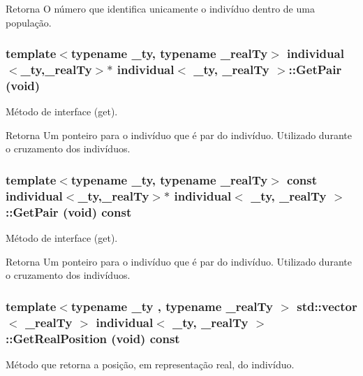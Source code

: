 \begin{DoxyReturn}{Retorna}
O número que identifica unicamente o indivíduo dentro de uma população. 
\end{DoxyReturn}
\hypertarget{classindividual_a57a124a83b28f8af06fa2e5dbcf30c55}{
\subsubsection[{GetPair}]{\setlength{\rightskip}{0pt plus 5cm}template$<$typename \_\-ty, typename \_\-realTy$>$ {\bf individual}$<$\_\-ty,\_\-realTy$>$$\ast$ {\bf individual}$<$ \_\-ty, \_\-realTy $>$::GetPair (void)}}
\label{classindividual_a57a124a83b28f8af06fa2e5dbcf30c55}
Método de interface (get).

\begin{DoxyReturn}{Retorna}
Um ponteiro para o indivíduo que é par do indivíduo. Utilizado durante o cruzamento dos indivíduos. 
\end{DoxyReturn}
\hypertarget{classindividual_ad9f03da405f7f069cbafd11387fbf5f9}{
\subsubsection[{GetPair}]{\setlength{\rightskip}{0pt plus 5cm}template$<$typename \_\-ty, typename \_\-realTy$>$ const {\bf individual}$<$\_\-ty,\_\-realTy$>$$\ast$ {\bf individual}$<$ \_\-ty, \_\-realTy $>$::GetPair (void) const}}
\label{classindividual_ad9f03da405f7f069cbafd11387fbf5f9}
Método de interface (get).

\begin{DoxyReturn}{Retorna}
Um ponteiro para o indivíduo que é par do indivíduo. Utilizado durante o cruzamento dos indivíduos. 
\end{DoxyReturn}
\hypertarget{classindividual_a23ee0230af928473dfb38c8d2f03a6d8}{
\subsubsection[{GetRealPosition}]{\setlength{\rightskip}{0pt plus 5cm}template$<$typename \_\-ty , typename \_\-realTy $>$ std::vector$<$ \_\-realTy $>$ {\bf individual}$<$ \_\-ty, \_\-realTy $>$::GetRealPosition (void) const}}
\label{classindividual_a23ee0230af928473dfb38c8d2f03a6d8}
Método que retorna a posição, em representação real, do indivíduo.

